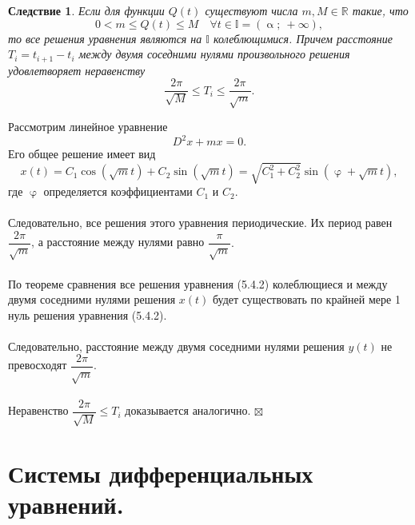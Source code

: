 \documentclass[a4paper, 12pt]{report}
\newenvironment{Proof} %
{\par\noindent{$\blacklozenge$}} %
{\hfill$\scriptstyle\boxtimes$}
\newcommand{\Rm}{\mathbb{R}}
\newcommand{\I}{\mathbb{I}}
\renewcommand{\leq}{\leqslant}
\renewcommand{\alpha}{\upalpha}
\renewcommand{\varphi}{\upvarphi}
\newtheorem*{cor}{Следствие}
\begin{document}
\begin{cor}
	Если для функции $Q(t)$ существуют числа $m, M \in \Rm$ такие, что $$ 0 < m \leq Q(t) \leq M\quad \forall t \in \I = (\alpha;\ +\infty),$$ то все решения уравнения являются на $\I$ колеблющимися. Причем расстояние $T_i = t_{i+1} - t_i$ между двумя соседними нулями произвольного решения удовлетворяет неравенству $$\dfrac{2\pi}{\sqrt M} \leq T_i\leq \dfrac{2\pi}{\sqrt m}.$$
\end{cor}\begin{Proof}
Рассмотрим линейное уравнение $$D^2x + mx = 0.$$
Его общее решение имеет вид $$x(t) = C_1\cos (\sqrt m t) + C_2\sin (\sqrt m t) = \sqrt{C_1^2 + C_2^2}\sin (\varphi + \sqrt m t),$$
где $\varphi$ определяется коэффициентами $C_1$ и $C_2$.\\\\
Следовательно, все решения этого уравнения периодические. Их период равен $\dfrac{2\pi}{\sqrt m}$, а расстояние между нулями равно $\dfrac{\pi}{\sqrt m}.$\\\\
По теореме сравнения все решения уравнения (5.4.2) колеблющиеся и между двумя соседними нулями решения $x(t)$ будет существовать по крайней мере 1 нуль решения уравнения (5.4.2).\\\\
Следовательно, расстояние между двумя соседними нулями решения $y(t)$ не превосходят $\dfrac{2\pi}{\sqrt m}$.\\\\
Неравенство $\dfrac{2\pi}{\sqrt M}  \leq T_i$ доказывается аналогично.
\end{Proof}
\chapter{Системы дифференциальных уравнений.}
\end{document}
